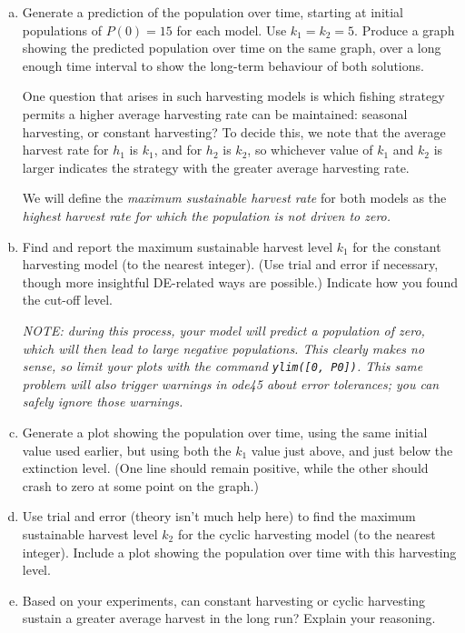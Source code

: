 \begin{enumerate}[1.]
\begin{Question}
\begin{enumerate}[(a)]
\item Generate a prediction of the population over time, starting at
  initial populations of $P(0) = 15$ for each model.  Use $k_1 = k_2 =
  5$. Produce a graph showing the predicted population over time on
  the same graph, over a long enough time interval to show the
  long-term behaviour of both solutions.

\vspace{0.2in}

One question that arises in such harvesting models is which fishing
strategy permits a higher average harvesting rate can be maintained:
seasonal harvesting, or constant harvesting?  To decide this, we note
that the average harvest rate for $h_1$ is $k_1$, and for $h_2$ is
$k_2$, so whichever value of $k_1$ and $k_2$ is larger indicates the
strategy with the greater average harvesting rate.

We will define the {\em maximum sustainable harvest rate} for both
models as the {\em highest harvest rate for which the population is
  not driven to zero.}

\item Find and report the maximum sustainable harvest level $k_1$ for
  the constant harvesting model (to the nearest integer).  (Use trial
  and error if necessary, though more insightful DE-related ways are
  possible.)  Indicate how you found the cut-off level. 

  {\em NOTE: during this process, your model will predict a population
    of zero, which will then lead to large negative populations.  This
    clearly makes no sense, so limit your plots with the command
    \verb#ylim([0, P0])#.  This same problem will also trigger
    warnings in ode45 about error tolerances; you can safely ignore
    those warnings.}

\item Generate a plot showing the population over time, using the same
  initial value used earlier, but using both the $k_1$ value just
  above, and just below the extinction level. (One line should remain
  positive, while the other should crash to zero at some point on the
  graph.)

\item Use trial and error (theory isn't much help here) to find the
  maximum sustainable harvest level $k_2$ for the cyclic harvesting
  model (to the nearest integer).  Include a plot showing the
  population over time with this harvesting level.

\item Based on your experiments, can constant harvesting or cyclic
  harvesting sustain a greater average harvest in the long run?
  Explain your reasoning.
\end{enumerate}
  \end{Question}


\end{enumerate}
